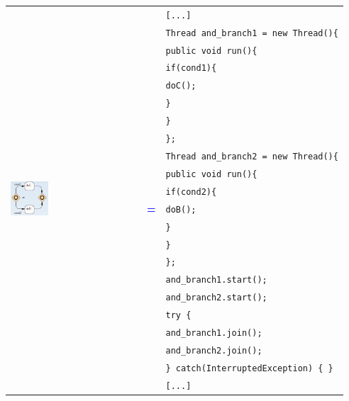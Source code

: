 \begin{tabularx}{\linewidth}{lcX}
	\multirow{22}{*}{\includegraphics[width=0.3\textwidth]{images/mapping/or-gateway.png}} &  & \texttt{[...]}\\
	& & \texttt{Thread and\_branch1 = new Thread()\{}\\
	& & \texttt{\hspace{10pt}public void run()\{}\\
	& & \texttt{\hspace{20pt}if(cond1)\{}\\
	& & \texttt{\hspace{30pt}doC();}\\
	& & \texttt{\hspace{20pt}\}}\\
	& & \texttt{\hspace{10pt}\}}\\
	& & \texttt{\};}\\
	& & \texttt{Thread and\_branch2 = new Thread()\{}\\
	& & \texttt{\hspace{10pt}public void run()\{}\\
	& & \texttt{\hspace{20pt}if(cond2)\{}\\
	& \textbf{\textcolor{blue}{=}} & \texttt{\hspace{30pt}doB();}\\
	& & \texttt{\hspace{20pt}\}}\\
	& & \texttt{\hspace{10pt}\}}\\
	& & \texttt{\};}\\
	& & \texttt{and\_branch1.start();}\\
	& & \texttt{and\_branch2.start();}\\
	& & \texttt{try \{}\\
	& & \texttt{\hspace{10pt}and\_branch1.join();}\\
	& & \texttt{\hspace{10pt}and\_branch2.join();}\\
	& & \texttt{\} catch(InterruptedException) \{ \}}\\
	& & \texttt{[...]}\\
\end{tabularx}\\\\


